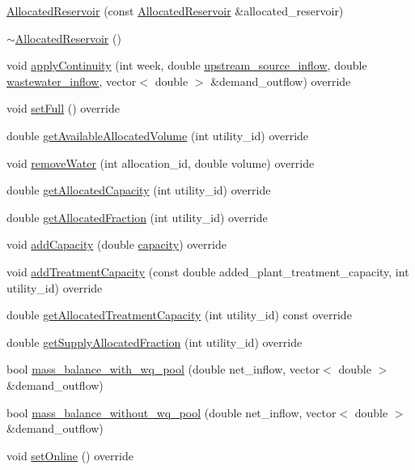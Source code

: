 \begin{DoxyCompactItemize}
\item 
\mbox{\hyperlink{classAllocatedReservoir_a59098eb446ada7a23e914543f3c419c0}{Allocated\+Reservoir}} (const \mbox{\hyperlink{classAllocatedReservoir}{Allocated\+Reservoir}} \&allocated\+\_\+reservoir)
\item 
\mbox{\hyperlink{classAllocatedReservoir_a3fc9aaca619a97d338449384e579900c}{$\sim$\+Allocated\+Reservoir}} ()
\item 
void \mbox{\hyperlink{classAllocatedReservoir_aa5a3683ac3a1e7a778627332c6a7fff7}{apply\+Continuity}} (int week, double \mbox{\hyperlink{classWaterSource_a7a69b2e9b6030f1035e6cf44d2918ee5}{upstream\+\_\+source\+\_\+inflow}}, double \mbox{\hyperlink{classWaterSource_aeb5a2d2d83383a70ca20f3e94635a9c7}{wastewater\+\_\+inflow}}, vector$<$ double $>$ \&demand\+\_\+outflow) override
\item 
void \mbox{\hyperlink{classAllocatedReservoir_aea294cbca1e1630a1307072632d14b05}{set\+Full}} () override
\item 
double \mbox{\hyperlink{classAllocatedReservoir_ae161ebfc285aa69cb8b7f4fe20ee7a2e}{get\+Available\+Allocated\+Volume}} (int utility\+\_\+id) override
\item 
void \mbox{\hyperlink{classAllocatedReservoir_a3a9b7ce2e1d42cc373095cfd40ef2ae2}{remove\+Water}} (int allocation\+\_\+id, double volume) override
\item 
double \mbox{\hyperlink{classAllocatedReservoir_a8b9b38494fa23f0bea78134c82644bf1}{get\+Allocated\+Capacity}} (int utility\+\_\+id) override
\item 
double \mbox{\hyperlink{classAllocatedReservoir_a731381982c9245b0bf24db4082dc74c1}{get\+Allocated\+Fraction}} (int utility\+\_\+id) override
\item 
void \mbox{\hyperlink{classAllocatedReservoir_ab4cd10b1a9b421309844bcec42899b70}{add\+Capacity}} (double \mbox{\hyperlink{classWaterSource_a2ec257b415b248214a8bce7fc5267723}{capacity}}) override
\item 
void \mbox{\hyperlink{classAllocatedReservoir_ab781bee3253277f1dcfa4c12756d9d6f}{add\+Treatment\+Capacity}} (const double added\+\_\+plant\+\_\+treatment\+\_\+capacity, int utility\+\_\+id) override
\item 
double \mbox{\hyperlink{classAllocatedReservoir_aba81b93e1aa1154ce411248903fabde6}{get\+Allocated\+Treatment\+Capacity}} (int utility\+\_\+id) const override
\item 
double \mbox{\hyperlink{classAllocatedReservoir_a114e9cde6a106b786ca0ed39283cbbed}{get\+Supply\+Allocated\+Fraction}} (int utility\+\_\+id) override
\item 
bool \mbox{\hyperlink{classAllocatedReservoir_a9d025365aa42dfff13a0aac8ea7863fa}{mass\+\_\+balance\+\_\+with\+\_\+wq\+\_\+pool}} (double net\+\_\+inflow, vector$<$ double $>$ \&demand\+\_\+outflow)
\item 
bool \mbox{\hyperlink{classAllocatedReservoir_ac719b30d5a83ba19ea722449ce9580e1}{mass\+\_\+balance\+\_\+without\+\_\+wq\+\_\+pool}} (double net\+\_\+inflow, vector$<$ double $>$ \&demand\+\_\+outflow)
\item 
void \mbox{\hyperlink{classAllocatedReservoir_a739d93f7981f597a3db0a3d613304b8e}{set\+Online}} () override
\end{DoxyCompactItemize}
